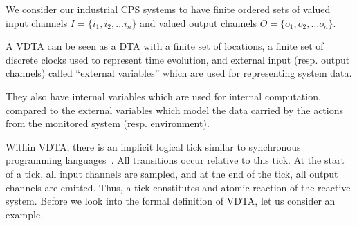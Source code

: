 We consider our industrial \ac{CPS} systems to have finite ordered sets of valued input channels ${I} = \{{i_1}, {i_2}, \ldots {i_n}\}$ and valued output channels ${O} = \{{o_1}, {o_2}, \ldots {o_n}\}$.


A VDTA can be seen as a DTA with a finite set of locations, a finite set of discrete clocks used to represent time evolution, and external input (resp. output channels) called ``external variables'' which are used for representing system data.

They also have internal variables which are used for internal computation, compared to the external variables which model the data carried by the actions from the monitored system (resp. environment). 

Within \ac{VDTA}, there is an implicit logical tick similar to synchronous programming languages~\cite{benveniste2003synchronous}.
All transitions occur relative to this tick.
At the start of a tick, all input channels are sampled, and at the end of the tick, all output channels are emitted.
Thus, a tick constitutes and atomic reaction of the reactive system.
Before we look into the formal definition of VDTA, let us consider an example.

